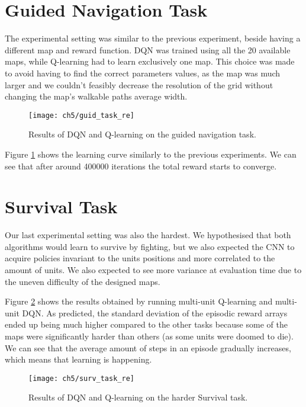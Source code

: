 \section{Guided Navigation Task}

The experimental setting was similar to the previous experiment, beside having a
different map and reward function. DQN was trained using all the 20 available
maps, while Q-learning had to learn exclusively one map. This choice was made to
avoid having to find the correct parameters values, as the map was much larger
and we couldn't feasibly decrease the resolution of the grid without changing
the map's walkable paths average width.

\begin{figure}[h]
    \centering
    \texttt{[image: ch5/guid\_task\_re]}
    \caption{Results of DQN and Q-learning on the guided navigation task.}
    \label{fig:guid_task_results}
\end{figure}

Figure \ref{fig:guid_task_results} shows the learning curve similarly to the
previous experiments. We can see that after around 400000 iterations the total
reward starts to converge.

\section{Survival Task}

Our last experimental setting was also the hardest. We hypothesised that both
algorithms would learn to survive by fighting, but we also expected the CNN to
acquire policies invariant to the units positions and more correlated to the
amount of units. We also expected to see more variance at evaluation time due to
the uneven difficulty of the designed maps.


Figure \ref{fig:surv_task_results} shows the results obtained by running
multi-unit Q-learning and multi-unit DQN. As predicted, the standard deviation
of the episodic reward arrays ended up being much higher compared to the other
tasks because some of the maps were significantly harder than others (as some
units were doomed to die). We can see that the average amount of steps in an
episode gradually increases, which means that learning is happening.

\begin{figure}[h]
    \centering
    \texttt{[image: ch5/surv\_task\_re]}
    \caption{Results of DQN and Q-learning on the harder Survival task.}
    \label{fig:surv_task_results}
\end{figure}

